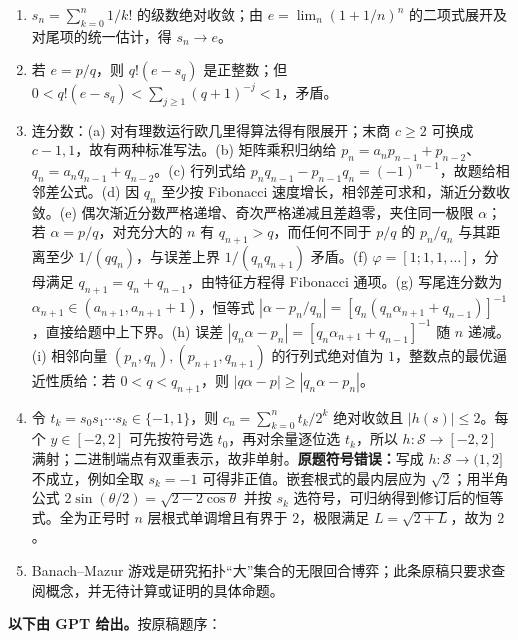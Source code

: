 \begin{enumerate}
\item $s_n=\sum_{k=0}^n1/k!$ 的级数绝对收敛；由 $e=\lim_n(1+1/n)^n$ 的二项式展开及对尾项的统一估计，得 $s_n\to e$。
\item 若 $e=p/q$，则 $q!(e-s_q)$ 是正整数；但 $0<q!(e-s_q)<\sum_{j\ge1}(q+1)^{-j}<1$，矛盾。
\item 连分数：(a) 对有理数运行欧几里得算法得有限展开；末商 $c\ge2$ 可换成 $c-1,1$，故有两种标准写法。(b) 矩阵乘积归纳给 $p_n=a_np_{n-1}+p_{n-2}$、$q_n=a_nq_{n-1}+q_{n-2}$。(c) 行列式给 $p_nq_{n-1}-p_{n-1}q_n=(-1)^{n-1}$，故题给相邻差公式。(d) 因 $q_n$ 至少按 Fibonacci 速度增长，相邻差可求和，渐近分数收敛。(e) 偶次渐近分数严格递增、奇次严格递减且差趋零，夹住同一极限 $\alpha$；若 $\alpha=p/q$，对充分大的 $n$ 有 $q_{n+1}>q$，而任何不同于 $p/q$ 的 $p_n/q_n$ 与其距离至少 $1/(qq_n)$，与误差上界 $1/(q_nq_{n+1})$ 矛盾。(f) $\varphi=[1;1,1,\ldots]$，分母满足 $q_{n+1}=q_n+q_{n-1}$，由特征方程得 Fibonacci 通项。(g) 写尾连分数为 $\alpha_{n+1}\in(a_{n+1},a_{n+1}+1)$，恒等式 $|\alpha-p_n/q_n|=[q_n(q_n\alpha_{n+1}+q_{n-1})]^{-1}$，直接给题中上下界。(h) 误差 $|q_n\alpha-p_n|=[q_n\alpha_{n+1}+q_{n-1}]^{-1}$ 随 $n$ 递减。(i) 相邻向量 $(p_n,q_n),(p_{n+1},q_{n+1})$ 的行列式绝对值为 $1$，整数点的最优逼近性质给：若 $0<q<q_{n+1}$，则 $|q\alpha-p|\ge|q_n\alpha-p_n|$。
\item 令 $t_k=s_0s_1\cdots s_k\in\{-1,1\}$，则 $c_n=\sum_{k=0}^nt_k/2^k$ 绝对收敛且 $|h(s)|\le2$。每个 $y\in[-2,2]$ 可先按符号选 $t_0$，再对余量逐位选 $t_k$，所以 $h:\mathcal S\to[-2,2]$ 满射；二进制端点有双重表示，故非单射。\textbf{原题符号错误：}写成 $h:\mathcal S\to(1,2]$ 不成立，例如全取 $s_k=-1$ 可得非正值。嵌套根式的最内层应为 $\sqrt2$；用半角公式 $2\sin(\theta/2)=\sqrt{2-2\cos\theta}$ 并按 $s_k$ 选符号，可归纳得到修订后的恒等式。全为正号时 $n$ 层根式单调增且有界于 $2$，极限满足 $L=\sqrt{2+L}$，故为 $2$。
\item Banach--Mazur 游戏是研究拓扑“大”集合的无限回合博弈；此条原稿只要求查阅概念，并无待计算或证明的具体命题。
\end{enumerate}
\noindent\textbf{以下由 GPT 给出。}按原稿题序：
